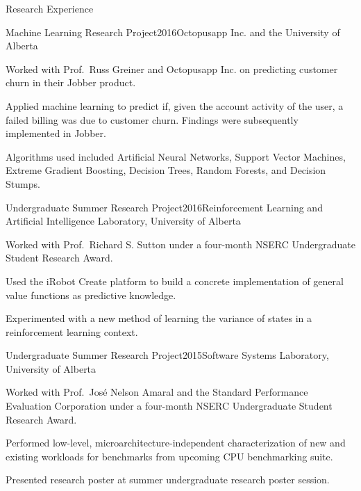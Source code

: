 \documentclass{cv}
\begin{document}
\begin{rSection}{Research Experience}

\begin{rSubsection}{Machine Learning Research Project}{2016}{Octopusapp Inc. and the University of Alberta}
\item Worked with Prof.~Russ Greiner and Octopusapp Inc. on predicting customer churn in their Jobber product.
\item Applied machine learning to predict if, given the account activity of the user, a failed billing was due to customer churn. Findings were subsequently implemented in Jobber.
\item Algorithms used included Artificial Neural Networks, Support Vector Machines, Extreme Gradient Boosting, Decision Trees, Random Forests, and Decision Stumps.
\end{rSubsection}


\begin{rSubsection}{Undergraduate Summer Research Project}{2016}{Reinforcement Learning and Artificial Intelligence Laboratory, University of Alberta}
\item Worked with Prof.~Richard S. Sutton under a four-month NSERC Undergraduate Student Research Award.
\item Used the iRobot Create platform to build a concrete implementation of general value functions as predictive knowledge.
\item Experimented with a new method of learning the variance of states in a reinforcement learning context.
\end{rSubsection}

\pagebreak


\begin{rSubsection}{Undergraduate Summer Research Project}{2015}{Software Systems Laboratory, University of Alberta}
\item Worked with Prof.~Jos{\'{e}} Nelson Amaral and the Standard Performance Evaluation Corporation under a four-month NSERC Undergraduate Student Research Award.
\item Performed low-level, microarchitecture-independent characterization of new and existing workloads for benchmarks from upcoming CPU benchmarking suite.
\item Presented research poster at summer undergraduate research poster session.
\end{rSubsection}

\end{rSection}
\end{document}
